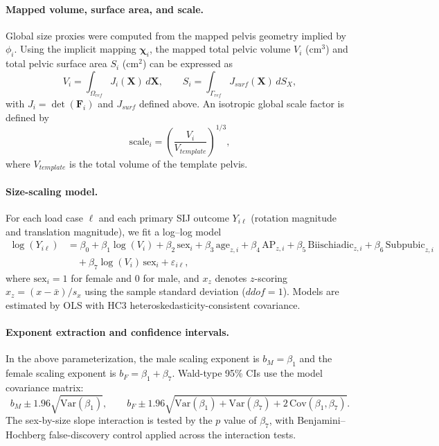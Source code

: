 \paragraph{Mapped volume, surface area, and scale.}
Global size proxies were computed from the mapped pelvis geometry implied by $\phi_i$. Using the implicit mapping $\boldsymbol{\chi}_i$, the mapped total pelvic volume $V_i$ (cm$^3$) and total pelvic surface area $S_i$ (cm$^2$) can be expressed as
\begin{equation}
V_i=\int_{\Omega_{ref}} J_i(\mathbf{X})\,d\mathbf{X},
\qquad
S_i=\int_{\Gamma_{ref}} J_{surf}(\mathbf{X})\,dS_X,
\end{equation}
with $J_i=\det(\mathbf{F}_i)$ and $J_{surf}$ defined above.
An isotropic global scale factor is defined by
\begin{equation}
\mathrm{scale}_i=\left(\frac{V_i}{V_{template}}\right)^{1/3},
\end{equation}
where $V_{template}$ is the total volume of the template pelvis.

\paragraph{Size-scaling model.}
For each load case $\ell$ and each primary SIJ outcome $Y_{i\ell}$ (rotation magnitude and translation magnitude), we fit a log--log model
\begin{align}
\log(Y_{i\ell}) &=
\beta_0
+\beta_1\log(V_i)
+\beta_2\,\mathrm{sex}_i
+\beta_3\,\mathrm{age}_{z,i}
+\beta_4\,\mathrm{AP}_{z,i}
+\beta_5\,\mathrm{Biischiadic}_{z,i}
+\beta_6\,\mathrm{Subpubic}_{z,i} \nonumber\\
&\quad
+\beta_7\log(V_i)\,\mathrm{sex}_i
+\varepsilon_{i\ell},
\end{align}
where $\mathrm{sex}_i=1$ for female and $0$ for male, and $x_{z}$ denotes $z$-scoring
$x_z=(x-\bar{x})/s_x$ using the sample standard deviation ($ddof=1$).
Models are estimated by OLS with HC3 heteroskedasticity-consistent covariance.

\paragraph{Exponent extraction and confidence intervals.}
In the above parameterization, the male scaling exponent is $b_M=\beta_1$ and the female scaling exponent is $b_F=\beta_1+\beta_7$.
Wald-type 95\% CIs use the model covariance matrix:
\begin{equation}
b_M \pm 1.96\sqrt{\mathrm{Var}(\beta_1)},
\qquad
b_F \pm 1.96\sqrt{\mathrm{Var}(\beta_1)+\mathrm{Var}(\beta_7)+2\,\mathrm{Cov}(\beta_1,\beta_7)}.
\end{equation}
The sex-by-size slope interaction is tested by the $p$ value of $\beta_7$, with Benjamini--Hochberg false-discovery control applied across the interaction tests.
